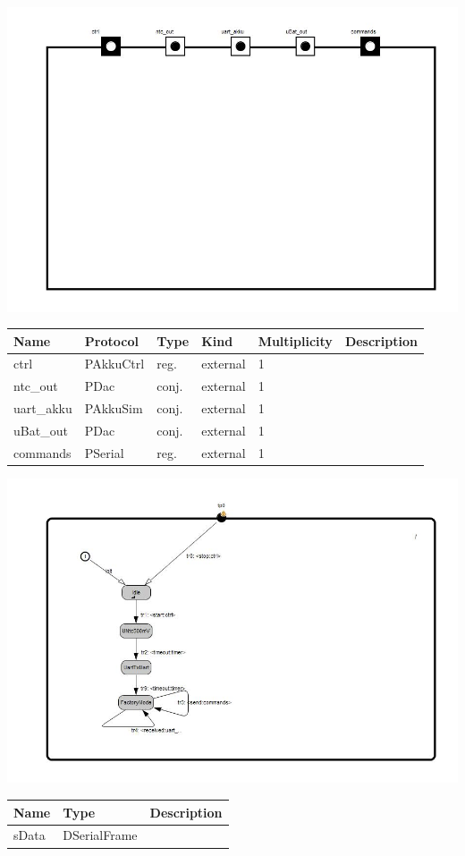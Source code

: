 
{
\centering{}
\includegraphics[width=1.0\textwidth]{./images/ATestAdapterSimu_structure.jpg}
}

\begin{tabular}[ht]{|l|l|l|l|l|p{5cm}|}
\hline
\textbf{Name} & \textbf{Protocol} & \textbf{Type} & \textbf{Kind} & \textbf{Multiplicity} & \textbf{Description}\\
\hline
ctrl & PAkkuCtrl & reg. & external & 1 & \\
\hline
ntc\_out & PDac & conj. & external & 1 & \\
\hline
uart\_akku & PAkkuSim & conj. & external & 1 & \\
\hline
uBat\_out & PDac & conj. & external & 1 & \\
\hline
commands & PSerial & reg. & external & 1 & \\
\hline
\end{tabular}

{
\centering{}
\includegraphics[width=1.0\textwidth]{./images/ATestAdapterSimu_behavior.jpg}
}

\begin{par}

\end{par}


\begin{tabular}[ht]{|l|l|p{8cm}|}
\hline
\textbf{Name} & \textbf{Type} & \textbf{Description}\\
\hline
sData & DSerialFrame & \\
\hline
\end{tabular}

